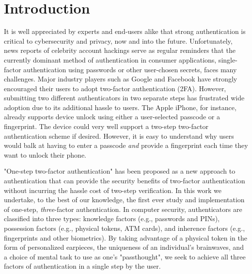 \documentclass{sigchi}
\begin{document}


\section{Introduction}

It is well appreciated by experts and end-users alike that strong authentication is
critical to cybersecurity and privacy, now and into the future. Unfortunately,
news reports of celebrity account hackings serve as regular reminders that
the currently dominant method of authentication in consumer applications, 
single-factor authentication using passwords or other user-chosen secrets, 
faces many challenges. Major industry players such as Google and
Facebook have strongly encouraged their users to adopt two-factor
authentication (2FA). However, submitting two different 
authenticators in two separate steps has frustrated wide adoption
due to its additional hassle to users. The Apple iPhone, for instance,
already supports device unlock using either a user-selected passcode or a fingerprint. The
device could very well support a two-step two-factor authentication scheme if
desired. However, it is easy to understand why users would balk at having to
enter a passcode \emph{and} provide a fingerprint each time they want to unlock their phone.

"One-step two-factor authentication" has been proposed as a new approach
to authentication that can provide the security benefits of two-factor authentication without incurring the hassle cost of two-step verification.
In this work we undertake, to the best of our knowledge, the first
ever study and implementation of one-step, \textit{three}-factor authentication. In computer security, authenticators are classified into three types: knowledge factors (e.g., passwords
and PINs), possession factors (e.g., physical tokens, ATM cards), and inherence
factors (e.g., fingerprints and other biometrics). By taking advantage of a physical token 
in the form of personalized earpieces, the uniqueness of an individual's brainwaves, and
a choice of mental task to use as one's "passthought", we seek to achieve all three factors 
of authentication in a single step by the user.
\end{document}
